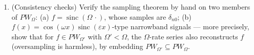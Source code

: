 \begin{problem}[{Weekend problem --- $\partial_tu =
\partial^2_{xx}u$, solved end to end}]
\begin{enumerate}[resume]
        the engineering rule: a signal band-limited to
        $\Omega$ whose energy is essentially carried by a
        time window of length $T$ is described by
        approximately $\frac{\Omega T}\pi$ real samples ---
        make ``essentially'' precise through the energy
        identity and the tail $\sum_{\abs{n\pi/\Omega} >
        T/2}$.
  \item (Consistency checks) Verify the sampling theorem by
        hand on two members of $PW_\Omega$: (a) $f =
        \operatorname{sinc}(\Omega\,\cdot)$, whose samples
        are $\delta_{n0}$; (b) $f(x) = \cos(\omega x)
        \operatorname{sinc}(\varepsilon x)$-type narrowband
        signals --- more precisely, show that for $f \in
        PW_{\Omega'}$ with $\Omega' < \Omega$, the
        $\Omega$-rate series also reconstructs $f$
        (oversampling is harmless), by embedding $PW_
        {\Omega'} \subseteq PW_\Omega$.
\end{enumerate}


\end{problem}
